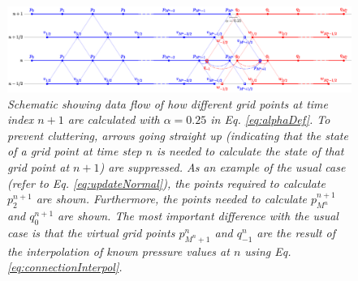 \begin{figure}[t]
    \centering
    \includegraphics[width = \textwidth]{figures/tromboneSchematic.eps}
    \caption{\it Schematic showing data flow of how different grid points at time index $n+1$ are calculated with $\alpha = 0.25$ in Eq. \eqref{eq:alphaDef}. To prevent cluttering, arrows going straight up (indicating that the state of a grid point at time step $n$ is needed to calculate the state of that grid point at $n+1$) are suppressed. As an example of the usual case (refer to Eq. \eqref{eq:updateNormal}), the points required to calculate $p_2^{n+1}$ are shown. Furthermore, the points needed to calculate $p_{M^n}^{n+1}$ and $q_0^{n+1}$ are shown. The most important difference with the usual case is that the virtual grid points $p_{M^n+1}^n$ and $q_{-1}^n$ 
    are the result of the interpolation of known pressure values at $n$ using Eq. \eqref{eq:connectionInterpol}. %
    \label{fig:dynamicGridSchematic}}
\end{figure}

